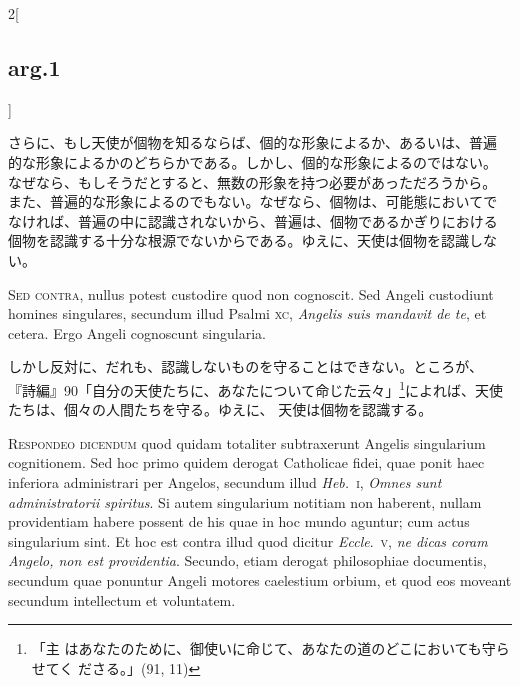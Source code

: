 \documentclass[paper=a4paper,fontsize=10pt,jafontsize=9pt,titlepage]{jlreq}
\begin{document}
\begin{paracol}{2}[\subsection{arg.1}]
\switchcolumn

さらに、もし天使が個物を知るならば、個的な形象によるか、あるいは、普遍
的な形象によるかのどちらかである。しかし、個的な形象によるのではない。
なぜなら、もしそうだとすると、無数の形象を持つ必要があっただろうから。
また、普遍的な形象によるのでもない。なぜなら、個物は、可能態においてで
なければ、普遍の中に認識されないから、普遍は、個物であるかぎりにおける
個物を認識する十分な根源でないからである。ゆえに、天使は個物を認識しな
い。

\switchcolumn*[\subsection{s.c.}]

{\scshape Sed contra}, nullus potest custodire quod non cognoscit. Sed
Angeli custodiunt homines singulares, secundum illud Psalmi {\scshape
xc}, {\itshape Angelis suis mandavit de te}, et cetera. Ergo Angeli
cognoscunt singularia.

\switchcolumn

しかし反対に、だれも、認識しないものを守ることはできない。ところが、
『詩編』90「自分の天使たちに、あなたについて命じた云々」\footnote{「主
はあなたのために、御使いに命じて、あなたの道のどこにおいても守らせてく
ださる。」(91, 11)}によれば、天使たちは、個々の人間たちを守る。ゆえに、
天使は個物を認識する。


{\scshape Respondeo dicendum} quod quidam totaliter subtraxerunt
Angelis singularium cognitionem. Sed hoc primo quidem derogat
Catholicae fidei, quae ponit haec inferiora administrari per Angelos,
secundum illud {\itshape Heb.}~{\scshape i}, {\itshape Omnes sunt
administratorii spiritus}. Si autem singularium notitiam non haberent,
nullam providentiam habere possent de his quae in hoc mundo aguntur;
cum actus singularium sint. Et hoc est contra illud quod dicitur
{\itshape Eccle}.~{\scshape v}, {\itshape ne dicas coram Angelo, non
est providentia}. Secundo, etiam derogat philosophiae documentis,
secundum quae ponuntur Angeli motores caelestium orbium, et quod eos
moveant secundum intellectum et voluntatem.

\switchcolumn


\end{paracol}
\end{document}
